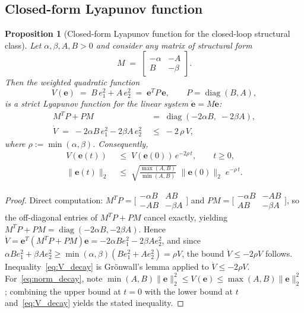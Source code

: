 \documentclass[12pt]{article}
\newtheorem{proposition}{Proposition}
\begin{document}
\subsection{Closed-form Lyapunov function}
\label{sec:lyap_function}

\begin{proposition}[Closed-form Lyapunov function for the closed-loop structural class]
\label{prop:lyapunov}
Let $\alpha, \beta, A, B > 0$ and consider any matrix of structural form
\begin{equation}
M \;=\; \begin{bmatrix} -\alpha & -A \\ B & -\beta \end{bmatrix}.
\label{eq:M_structure}
\end{equation}
Then the weighted quadratic function
\begin{equation}
V(\mathbf{e}) \;=\; B\,e_1^2 + A\,e_2^2 \;=\; \mathbf{e}^{T} P\, \mathbf{e},
\qquad P = \operatorname{diag}(B, A),
\label{eq:V_def}
\end{equation}
is a strict Lyapunov function for the linear system $\dot{\mathbf{e}} = M\mathbf{e}$:
\begin{align}
M^{T} P + P M &\;=\; \operatorname{diag}(-2\alpha B,\; -2\beta A),
\label{eq:Vdot_bound}\\
\dot{V} \;=\; -2\alpha B\,e_1^2 - 2\beta A\,e_2^2 &\;\leq\; -2\,\rho\, V,
\nonumber
\end{align}
where $\rho := \min(\alpha,\beta)$. Consequently,
\begin{align}
V(\mathbf{e}(t)) &\;\leq\; V(\mathbf{e}(0))\,e^{-2\rho\,t},\qquad t\geq 0,
\label{eq:V_decay}\\
\|\mathbf{e}(t)\|_{2} &\;\leq\; \sqrt{\frac{\max(A,B)}{\min(A,B)}}\;\|\mathbf{e}(0)\|_{2}\;e^{-\rho\,t}.
\label{eq:norm_decay}
\end{align}
\end{proposition}

\begin{proof}
Direct computation:
$M^T P = \bigl[\begin{smallmatrix}-\alpha B & AB\\ -AB & -\beta A\end{smallmatrix}\bigr]$
and
$P M = \bigl[\begin{smallmatrix}-\alpha B & -AB\\ AB & -\beta A\end{smallmatrix}\bigr]$,
so the off-diagonal entries of $M^T P + PM$ cancel exactly, yielding
$M^T P + PM = \operatorname{diag}(-2\alpha B, -2\beta A)$. Hence
$\dot{V} = \mathbf{e}^T(M^T P + PM)\mathbf{e} = -2\alpha B e_1^2 - 2\beta A e_2^2$,
and since $\alpha B e_1^2 + \beta A e_2^2 \geq \min(\alpha,\beta)(B e_1^2 + A e_2^2) = \rho V$,
the bound $\dot V \leq -2\rho V$ follows. Inequality~\eqref{eq:V_decay} is
Gr\"onwall's lemma applied to $\dot{V}\leq -2\rho V$. For~\eqref{eq:norm_decay},
note $\min(A,B)\|\mathbf{e}\|_2^2 \leq V(\mathbf{e}) \leq \max(A,B)\|\mathbf{e}\|_2^2$;
combining the upper bound at $t=0$ with the lower bound at $t$
and~\eqref{eq:V_decay} yields the stated inequality.
\end{proof}
\end{document}

